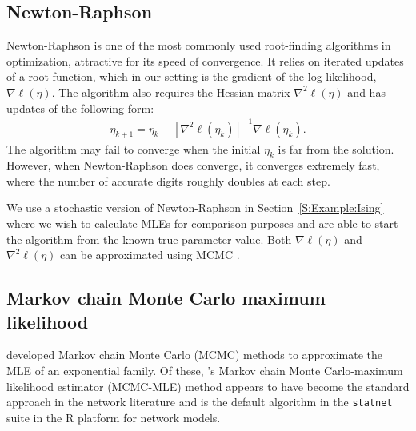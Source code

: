 \subsection{Newton-Raphson}
Newton-Raphson is one of the most commonly used root-finding algorithms
in optimization, attractive
for its speed of convergence.  It relies on iterated updates of a root 
function, which in our setting is the gradient of the log likelihood, $\nabla \ell(\eta)$.  
The algorithm also requires the Hessian matrix $\nabla^2 \ell(\eta)$ and has updates 
of the following form:
\begin{align}
	\eta_{k+1} = \eta_k - \left[ \nabla^2 \ell(\eta_k) \right ]^{-1} \nabla \ell(\eta_k).
\end{align}
The algorithm may fail to 
converge when the initial $\eta_k$ is far from the solution.  However,
when Newton-Raphson does converge, it converges extremely fast, 
where the number of accurate digits roughly doubles at each step.

We use a stochastic version of Newton-Raphson in Section~\ref{S:Example:Ising} where 
we wish to calculate MLEs for comparison purposes and are able to start the algorithm from the known true parameter value.
Both $\nabla \ell(\eta)$ and $\nabla^2 \ell(\eta)$ can be approximated using MCMC 
 \citep{Penttinen:1984}.
\subsection{Markov chain Monte Carlo maximum likelihood} \label{S:MCMC-MLE}
\citet{Geyer:1992, Corander:1998, Snijders:2002} developed Markov chain Monte Carlo 
(MCMC) methods to approximate the MLE of an exponential family.  Of these, \citeauthor
{Geyer:1992}'s Markov chain Monte Carlo-maximum likelihood estimator (MCMC-MLE) method 
appears to have become the standard approach in the network literature 
\citep{Hunter:2006, Handcock:2006, GOF} and is the default algorithm in 
the \texttt{statnet} suite \citep{statnet:R} in the R platform for network models.  

